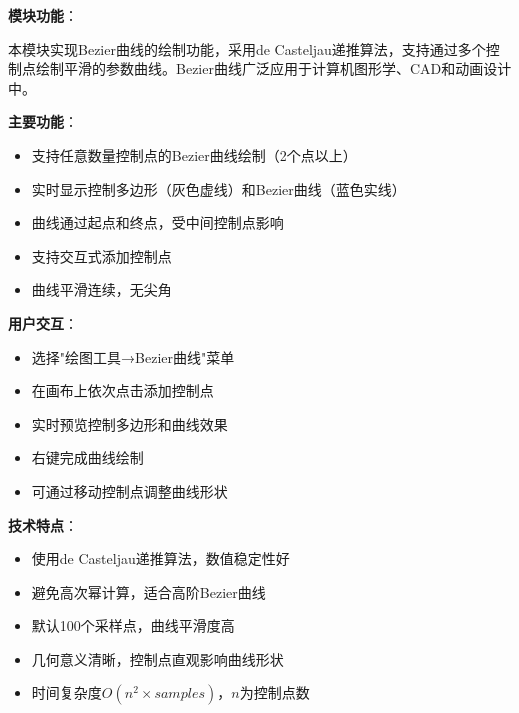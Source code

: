 \documentclass[12pt,a4paper]{article}
\begin{document}
\begin{tcolorbox}
\textbf{模块功能}：

本模块实现Bezier曲线的绘制功能，采用de Casteljau递推算法，支持通过多个控制点绘制平滑的参数曲线。Bezier曲线广泛应用于计算机图形学、CAD和动画设计中。

\textbf{主要功能}：
\begin{itemize}
    \item 支持任意数量控制点的Bezier曲线绘制（2个点以上）
    \item 实时显示控制多边形（灰色虚线）和Bezier曲线（蓝色实线）
    \item 曲线通过起点和终点，受中间控制点影响
    \item 支持交互式添加控制点
    \item 曲线平滑连续，无尖角
\end{itemize}

\textbf{用户交互}：
\begin{itemize}
    \item 选择"绘图工具→Bezier曲线"菜单
    \item 在画布上依次点击添加控制点
    \item 实时预览控制多边形和曲线效果
    \item 右键完成曲线绘制
    \item 可通过移动控制点调整曲线形状
\end{itemize}

\textbf{技术特点}：
\begin{itemize}
    \item 使用de Casteljau递推算法，数值稳定性好
    \item 避免高次幂计算，适合高阶Bezier曲线
    \item 默认100个采样点，曲线平滑度高
    \item 几何意义清晰，控制点直观影响曲线形状
    \item 时间复杂度$O(n^2 \times samples)$，$n$为控制点数
\end{itemize}
\end{tcolorbox}

\clearpage
\end{document}

